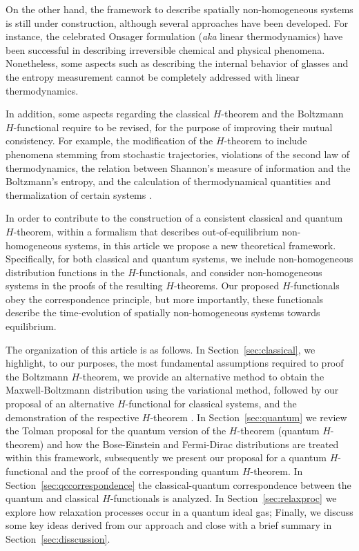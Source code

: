 On the other hand, the framework to describe spatially non-homogeneous systems is still
under construction, although several approaches have been developed. For instance,
the celebrated Onsager formulation (\textit{aka} linear thermodynamics)
\cite{bib:keizer1987,bib:onsager1931} have been successful in describing irreversible chemical 
and physical phenomena. Nonetheless, some aspects such as describing the internal behavior of glasses
\cite{bib:zanotto2018} and the entropy measurement
\cite{bib:schmelzer2018,bib:nemilov2018} cannot be completely addressed with linear thermodynamics.

In addition, some aspects regarding the classical $H$-theorem and the
Boltzmann $H$-functional require to be revised, for the purpose of improving their mutual consistency.
For example, the modification of the $H$-theorem to include phenomena stemming from stochastic
trajectories, violations of the second law of thermodynamics, the relation
between Shannon's measure of information and the Boltzmann's entropy, 
and the calculation of thermodynamical quantities and thermalization of certain systems
\cite{bib:gorban2014,bib:li2019,bib:gring2012,bib:nemilov2018,bib:wang2014}.

In order to contribute to the construction of a consistent classical and
quantum $H$-theorem, within a formalism that describes out-of-equilibrium
non-homogeneous systems, in this article we propose a new theoretical framework.
Specifically, for both classical and quantum systems, we include non-homogeneous distribution functions in
the $H$-functionals, and consider non-homogeneous systems in the proofs of the resulting
$H$-theorems. Our proposed $H$-functionals obey
the correspondence principle, but more importantly, these functionals describe
the time-evolution of spatially non-homogeneous
systems towards equilibrium.

The organization of this article is as follows.
In Section~\ref{sec:classical}, we highlight, to our purposes, the most
fundamental assumptions required to proof the Boltzmann $H$-theorem,
we provide an alternative method to obtain the Maxwell-Boltzmann
distribution using the variational method, followed by our proposal of
an alternative $H$-functional for classical systems, and the demonstration of
the respective $H$-theorem . In Section~\ref{sec:quantum}
we review the Tolman proposal for the quantum
version of the $H$-theorem (quantum $H$-theorem)
and how the Bose-Einstein and Fermi-Dirac distributions are treated within
this framework, subsequently we present our proposal for a quantum $H$-functional
and the proof of the corresponding quantum $H$-theorem. In 
Section~\ref{sec:qccorrespondence}
the classical-quantum correspondence between the
quantum and classical $H$-functionals is analyzed.
In Section~\ref{sec:relaxproc} we explore how relaxation processes occur
in a quantum ideal gas;  Finally,
we discuss some key ideas derived from our approach and close with a brief summary
in Section~\ref{sec:disscussion}.



